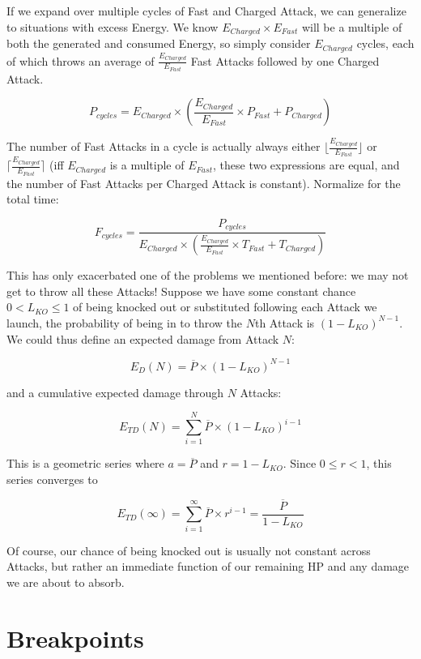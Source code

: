 If we expand over multiple cycles of Fast and Charged Attack, we can
 generalize to situations with excess Energy. We know $E_{Charged} \times
 E_{Fast}$ will be a multiple of both the generated and consumed Energy, so
 simply consider $E_{Charged}$ cycles, each of which throws an average of
 $\frac{E_{Charged}}{E_{Fast}}$ Fast Attacks followed by one Charged Attack.

\[ P_{cycles} = E_{Charged} \times (\frac{E_{Charged}}{E_{Fast}} \times P_{Fast} + P_{Charged}) \]

 The number of Fast Attacks in a cycle is actually always either
 $\lfloor\frac{E_{Charged}}{E_{Fast}}\rfloor$
 or $\lceil\frac{E_{Charged}}{E_{Fast}}\rceil$ (iff $E_{Charged}$ is a multiple of
 $E_{Fast}$, these two expressions are equal, and the number of Fast Attacks
 per Charged Attack is constant). Normalize for the total time:

\[ F_{cycles} = \frac{P_{cycles}}{E_{Charged} \times (\frac{E_{Charged}}{E_{Fast}} \times T_{Fast} + T_{Charged})} \]

This has only exacerbated one of the problems we mentioned before: we may
  not get to throw all these Attacks!
Suppose we have some constant chance $0 < L_{KO} \leq 1$ of being knocked out or
 substituted following each Attack we launch, the probability of being
 in to throw the $N$th Attack is $(1 - L_{KO})^{N-1}$.
We could thus define an expected damage from Attack $N$:

\[ E_D(N) = \overline{P} \times (1 - L_{KO})^{N-1} \]

and a cumulative expected damage through $N$ Attacks:

\[ E_{TD}(N) = \sum^N_{i=1} \overline{P} \times (1 - L_{KO})^{i-1} \]

This is a geometric series where $a = \overline{P}$ and $r = 1 - L_{KO}$.
Since $0 \leq r < 1$, this series converges to

\[ E_{TD}(\infty) = \sum^\infty_{i=1} \overline{P} \times r^{i-1} = \frac{\overline{P}}{1 - L_{KO}} \]

Of course, our chance of being knocked out is usually not constant across
 Attacks, but rather an immediate function of our remaining HP and any
 damage we are about to absorb.

\section{Breakpoints}
\label{sec:breakpoints}
